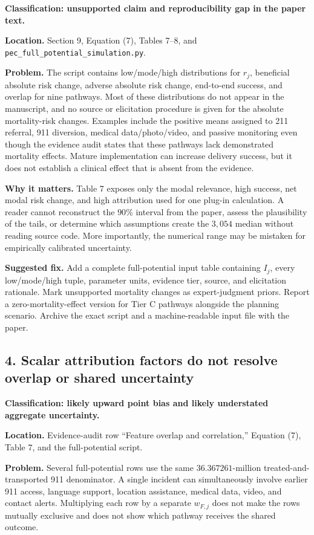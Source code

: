 \documentclass[11pt]{article}
\begin{document}
\textbf{Classification: unsupported claim and reproducibility gap in the
paper text.}

\textbf{Location.} Section 9, Equation (7), Tables 7--8, and
\texttt{pec\_full\_potential\_simulation.py}.

\textbf{Problem.} The script contains low/mode/high distributions for
$r_j$, beneficial absolute risk change, adverse absolute risk change,
end-to-end success, and overlap for nine pathways.  Most of these distributions
do not appear in the manuscript, and no source or elicitation procedure is
given for the absolute mortality-risk changes.  Examples include the positive
means assigned to 211 referral, 911 diversion, medical data/photo/video, and
passive monitoring even though the evidence audit states that these pathways
lack demonstrated mortality effects.  Mature implementation can increase
delivery success, but it does not establish a clinical effect that is absent
from the evidence.

\textbf{Why it matters.} Table 7 exposes only the modal relevance, high
success, net modal risk change, and high attribution used for one plug-in
calculation.  A reader cannot reconstruct the $90\%$ interval from the paper,
assess the plausibility of the tails, or determine which assumptions create the
$3{,}054$ median without reading source code.  More importantly, the numerical
range may be mistaken for empirically calibrated uncertainty.

\textbf{Suggested fix.} Add a complete full-potential input table containing
$I_j$, every low/mode/high tuple, parameter units, evidence tier, source, and
elicitation rationale.  Mark unsupported mortality changes as expert-judgment
priors.  Report a zero-mortality-effect version for Tier C pathways alongside
the planning scenario.  Archive the exact script and a machine-readable input
file with the paper.

\subsection*{4. Scalar attribution factors do not resolve overlap or shared uncertainty}

\textbf{Classification: likely upward point bias and likely understated
aggregate uncertainty.}

\textbf{Location.} Evidence-audit row ``Feature overlap and correlation,''
Equation (7), Table 7, and the full-potential script.

\textbf{Problem.} Several full-potential rows use the same
$36.367261$-million treated-and-transported 911 denominator.  A single incident
can simultaneously involve earlier 911 access, language support, location
assistance, medical data, video, and contact alerts.  Multiplying each row by a
separate $w_{F,j}$ does not make the rows mutually exclusive and does not show
which pathway receives the shared outcome.
\end{document}
